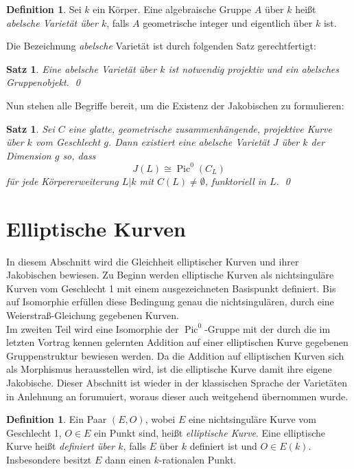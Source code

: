 \documentclass{amsart}
\theoremstyle{plain}
\newtheorem{proposition}[subsection]{Satz}
\theoremstyle{definition}
\newtheorem{definition}[subsection]{Definition}
\newcommand{\pic}{\operatorname{Pic}}
\begin{document}
\begin{definition}
	Sei $k$ ein Körper. Eine algebraische Gruppe $A$ über $k$ heißt {\it abelsche Varietät über $k$}, falls $A$ geometrische integer und eigentlich über $k$ ist.
\end{definition}

\noindent Die Bezeichnung {\it abelsche} Varietät ist durch folgenden Satz gerechtfertigt:
\begin{proposition}
	Eine abelsche Varietät über $k$ ist notwendig projektiv und ein abelsches Gruppenobjekt. \qed
\end{proposition}

Nun stehen alle Begriffe bereit, um die Existenz der Jakobischen zu formulieren:
\begin{proposition}
	Sei $C$ eine glatte, geometrische zusammenhängende, projektive Kurve über $k$ vom Geschlecht $g$. Dann existiert eine abelsche Varietät $J$ über $k$ der Dimension $g$ so, dass 
	\begin{equation*}
		J(L) \cong \pic^0(C_L)
	\end{equation*}
	für jede Körpererweiterung $L | k$ mit $C(L) \neq \emptyset$, funktoriell in $L$. \qed
\end{proposition}




\section{Elliptische Kurven}
\label{section-elliptische-kurven}

In diesem Abschnitt wird die Gleichheit elliptischer Kurven und ihrer Jakobischen bewiesen.
Zu Beginn werden elliptische Kurven als nichtsinguläre Kurven vom Geschlecht 1 mit einem ausgezeichneten Basispunkt definiert.
Bis auf Isomorphie erfüllen diese Bedingung genau die nichtsingulären, durch eine Weierstraß-Gleichung gegebenen Kurven. \\
Im zweiten Teil wird eine Isomorphie der $\pic^0$-Gruppe mit der durch die im letzten Vortrag kennen gelernten Addition auf einer elliptischen Kurve gegebenen Gruppenstruktur bewiesen werden.
Da die Addition auf elliptischen Kurven sich als Morphismus herausstellen wird, ist die elliptische Kurve damit ihre eigene Jakobische.
Dieser Abschnitt ist wieder in der klassischen Sprache der Varietäten in Anlehnung an \cite{silverman} forumuiert, woraus dieser auch weitgehend übernommen wurde.

\begin{definition}
	Ein Paar $(E, O)$, wobei $E$ eine nichtsinguläre Kurve vom Geschlecht 1, $O \in E$ ein Punkt sind, heißt {\it elliptische Kurve}.
	Eine elliptische Kurve heißt {\it definiert über $k$}, falls $E$ über $k$ definiert ist und $O \in E(k)$. Insbesondere besitzt $E$ dann einen $k$-rationalen Punkt.
\end{definition}
\end{document}
